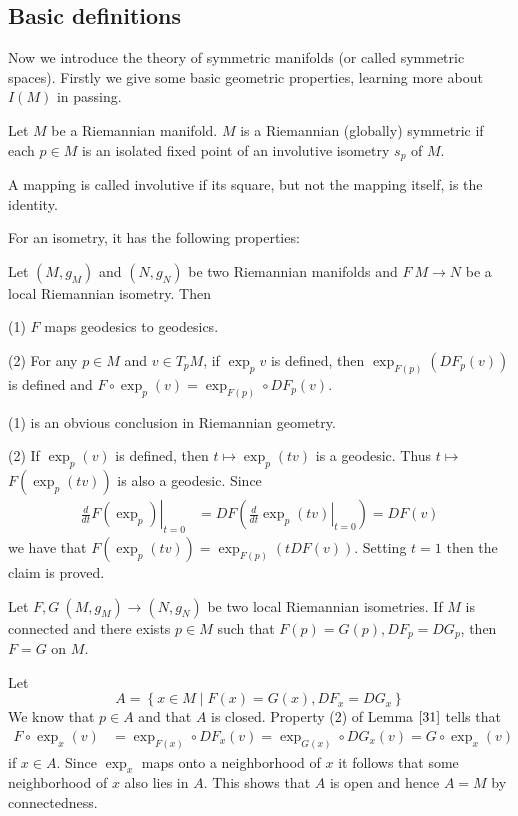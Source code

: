 \subsection{Basic definitions}

Now we introduce the theory of symmetric manifolds (or called
symmetric spaces). Firstly we give some basic geometric
properties, learning more about $I(M)$ in passing.

\begin{definition}
Let $M$ be a Riemannian manifold. $M$ is a  Riemannian (globally)
symmetric
if each $p \in M$ is an isolated fixed point of an involutive
isometry $s_{p}$ of $M$.	
\end{definition}
\begin{definition}
	A mapping is called involutive if its square, but not the
	mapping itself, is
	the identity.
\end{definition}
For an isometry, it has the following properties:
\begin{lemma}\label{31}
	Let $\left( M, g_{M} \right)$ and $\left( N, g_{N} \right)$
	be two Riemannian manifolds and $F\: M \rightarrow N$ be a
	local Riemannian isometry. Then
	
	(1) $F$ maps geodesics to geodesics.
	
	(2) For any $p \in M$ and $v \in T_{p} M$, if $\exp _{p} v$
	is defined, then $\exp _{F(p)}\left( D F_{p}(v) \right)$ is
	defined and $F \circ \exp _{p}(v) = \exp _{F(p)} \circ D
	F_{p}(v) .$
\end{lemma}
\bproof

(1) is an obvious conclusion in Riemannian geometry.

(2) If $\exp _{p}(v)$ is defined, then $t \mapsto \exp _{p}(t v)$
is a geodesic. Thus $t \mapsto$ $F\left( \exp _{p}(t v) \right)$
is also a geodesic. Since
\[
\begin{aligned}
	\left.\frac{d}{d t} F\left( \exp _{p}
	\right)\right|_{t=0} &=D F\left( \left .\frac{d}{d t} \exp
	_{p}(t v) \right|_{t=0} \right) =D F(v)
\end{aligned}
\]
we have that $F\left( \exp _{p}(t v) \right)=\exp _{F(p)}(t D
F(v))$. Setting $t=1$ then the claim is proved.
\eproof
\begin{corollary}\label{11.2}
Let $F, G\:\left( M, g_{M} \right) \rightarrow \left( N, g_{N}
\right)$ be two local Riemannian isometries. If $M$ is connected
and there exists $p \in M$ such that $F(p) = G(p), D F_{p} = D
G_{p}$, then
$F=G$ on $M$.	
\end{corollary}
\bproof
Let
\[
A=\left\{ x \in M \mid F(x) = G(x), D F_{x} = D G_{x} \right\}
\]
We know that $p \in A$ and that $A$ is closed. Property (2) of
Lemma $\ref{31}$ tells
that
\[
\begin{aligned}
	F \circ \exp _{x}(v) & = \exp _{F(x)} \circ D F_{x}(v) =\exp
	_{G(x)} \circ D G_{x}(v) = G \circ \exp _{x}(v)
\end{aligned}
\]
if $x \in A$. Since $\exp _{x}$ maps onto a neighborhood of $x$
it follows that some
neighborhood of $x$ also lies in $A$. This shows that $A$ is open
and hence 
$A=M$ by connectedness.
\eproof

